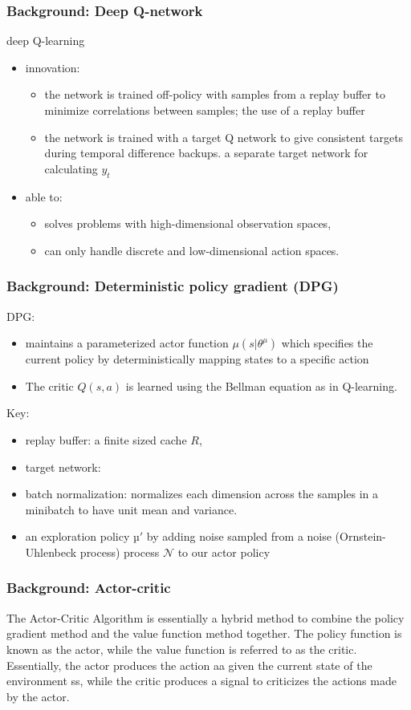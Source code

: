 \begin{frame}
\frametitle{Background: Deep Q-network}
deep Q-learning \cite{Mnih2013}
\begin{itemize}
  \item innovation:
  \begin{itemize}
    \item the network is trained off-policy with samples from a replay buffer to minimize correlations between samples;
    the use of a replay buffer
    \item the network is trained with a target Q network to give consistent targets during temporal difference backups.
    a separate target network for calculating $y_t$
  \end{itemize}
  \item able to:
  \begin{itemize}
    \item solves problems with high-dimensional observation spaces,
    \item can only handle discrete and low-dimensional action spaces.
  \end{itemize}
\end{itemize}

\end{frame}

\begin{frame}
\frametitle{Background: Deterministic policy gradient (DPG) \cite{Silver2014}}

DPG:
\begin{itemize}
  \item maintains a parameterized actor function $\mu (s|\theta^{\mu})$ which
  specifies the current policy by deterministically mapping states to a specific action
  \item The critic $Q(s, a)$ is learned using the Bellman equation as in Q-learning.
\end{itemize}

Key:
\begin{itemize}
  \item replay buffer: a finite sized cache $R$,
  \item target network:
  \item batch normalization: normalizes each dimension across the samples
  in a minibatch to have unit mean and variance.
  \item an exploration policy $µ'$ by adding noise sampled from
  a noise (Ornstein-Uhlenbeck process) process $\mathcal{N}$ to our actor policy
\end{itemize}

\end{frame}

\begin{frame}
\frametitle{Background: Actor-critic \cite{Sutton1998}}
The Actor-Critic Algorithm is essentially a hybrid method to combine the policy gradient method and the value function method together.
The policy function is known as the actor, while the value function is referred to as the critic.
Essentially, the actor produces the action aa given the current state of the environment ss, while the critic produces a signal to criticizes the actions made by the actor.
\end{frame}


